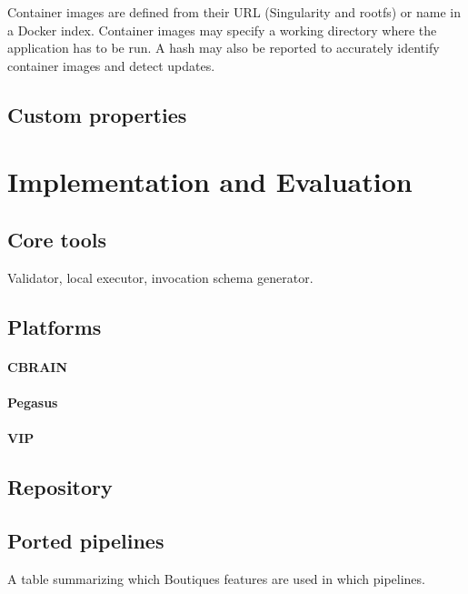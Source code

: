 \documentclass{article}
\begin{document}
Container images are defined from their URL (Singularity and rootfs)
or name in a Docker index. Container images may specify a working
directory where the application has to be run. A hash may also be
reported to accurately identify container images and detect updates.

\subsection{Custom properties}

\section{Implementation and Evaluation}

\subsection{Core tools} Validator, local executor, invocation schema generator.


\subsection{Platforms}

\paragraph{CBRAIN}

\paragraph{Pegasus}

\paragraph{VIP}

\subsection{Repository}

\subsection{Ported pipelines}


A table summarizing which Boutiques features are used in which pipelines.
\end{document}
